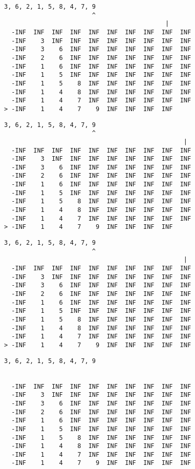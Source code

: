 { \begin{verbatim}
3, 6, 2, 1, 5, 8, 4, 7, 9
                        ^
                                            |
  -INF  INF  INF  INF  INF  INF  INF  INF  INF  INF
  -INF    3  INF  INF  INF  INF  INF  INF  INF  INF
  -INF    3    6  INF  INF  INF  INF  INF  INF  INF
  -INF    2    6  INF  INF  INF  INF  INF  INF  INF
  -INF    1    6  INF  INF  INF  INF  INF  INF  INF
  -INF    1    5  INF  INF  INF  INF  INF  INF  INF
  -INF    1    5    8  INF  INF  INF  INF  INF  INF
  -INF    1    4    8  INF  INF  INF  INF  INF  INF
  -INF    1    4    7  INF  INF  INF  INF  INF  INF
> -INF    1    4    7    9  INF  INF  INF  INF     
\end{verbatim} }

{ \begin{verbatim}
3, 6, 2, 1, 5, 8, 4, 7, 9
                        ^
                                                 |
  -INF  INF  INF  INF  INF  INF  INF  INF  INF  INF
  -INF    3  INF  INF  INF  INF  INF  INF  INF  INF
  -INF    3    6  INF  INF  INF  INF  INF  INF  INF
  -INF    2    6  INF  INF  INF  INF  INF  INF  INF
  -INF    1    6  INF  INF  INF  INF  INF  INF  INF
  -INF    1    5  INF  INF  INF  INF  INF  INF  INF
  -INF    1    5    8  INF  INF  INF  INF  INF  INF
  -INF    1    4    8  INF  INF  INF  INF  INF  INF
  -INF    1    4    7  INF  INF  INF  INF  INF  INF
> -INF    1    4    7    9  INF  INF  INF  INF     
\end{verbatim} }

{ \begin{verbatim}
3, 6, 2, 1, 5, 8, 4, 7, 9
                        ^
                                                 |
  -INF  INF  INF  INF  INF  INF  INF  INF  INF  INF
  -INF    3  INF  INF  INF  INF  INF  INF  INF  INF
  -INF    3    6  INF  INF  INF  INF  INF  INF  INF
  -INF    2    6  INF  INF  INF  INF  INF  INF  INF
  -INF    1    6  INF  INF  INF  INF  INF  INF  INF
  -INF    1    5  INF  INF  INF  INF  INF  INF  INF
  -INF    1    5    8  INF  INF  INF  INF  INF  INF
  -INF    1    4    8  INF  INF  INF  INF  INF  INF
  -INF    1    4    7  INF  INF  INF  INF  INF  INF
> -INF    1    4    7    9  INF  INF  INF  INF  INF
\end{verbatim} }

{ \begin{verbatim}
3, 6, 2, 1, 5, 8, 4, 7, 9


  -INF  INF  INF  INF  INF  INF  INF  INF  INF  INF
  -INF    3  INF  INF  INF  INF  INF  INF  INF  INF
  -INF    3    6  INF  INF  INF  INF  INF  INF  INF
  -INF    2    6  INF  INF  INF  INF  INF  INF  INF
  -INF    1    6  INF  INF  INF  INF  INF  INF  INF
  -INF    1    5  INF  INF  INF  INF  INF  INF  INF
  -INF    1    5    8  INF  INF  INF  INF  INF  INF
  -INF    1    4    8  INF  INF  INF  INF  INF  INF
  -INF    1    4    7  INF  INF  INF  INF  INF  INF
  -INF    1    4    7    9  INF  INF  INF  INF  INF
\end{verbatim} }

